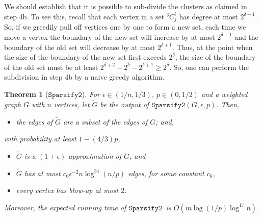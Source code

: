 \documentclass[11pt]{article}
\newtheorem{theorem}{Theorem}[section]
\newcommand{\sparsifytwo}{\ensuremath{\mathtt{Sparsify2}}}
\def\Gtil{\widetilde{G}}
\def\preDelta#1{{}^{\delta}\!{#1}}
\begin{document}
We should establish that it is possible to sub-divide the clusters
  as claimed in step 4b.
To see this, recall that each vertex in a set $\preDelta{C}^{i}_{j}$
  has degree at most $2^{\delta +1}$.
So, if we greedily pull off vertices one by one to form a new set, each time we
  move a vertex the boundary of the new set will increase by at most
  $2^{\delta +1}$ and the boundary of the old set will decrease by at most
  $2^{\delta +1}$.
Thus, at the point when the size of the boundary of the new set
  first exceeds $2^{\delta }$, the size of the boundary of the old set must
  be at least $2^{\delta +2} - 2^{\delta} - 2^{\delta +1} \geq 2^{\delta}$.
So, one can perform the subdivision in step 4b by a naive greedy algorithm.

\begin{theorem}[\sparsifytwo]\label{thm:sparsifytwo}
For $\epsilon \in (1/n, 1/3)$, $p \in (0,1/2)$ and a weighted graph $G$
  with $n$ vertices, let
$\Gtil$ be the output of $\sparsifytwo (G, \epsilon , p)$.
Then,
\begin{itemize}
\item [(Y.1)] the edges of $\Gtil$ are a subset of the edges of $G$; and,
\end{itemize}
with probability at least $1-(4/3) p$,
\begin{itemize}
\item [(Y.2)] $\Gtil$ is a $(1+\epsilon)$-approximation of $G$, and
\item [(Y.3)] $\Gtil$ has at most
  $c_{6} \epsilon^{-2} n \log^{34} (n/p)$
  edges, for some constant $c_{6}$,
\item [(Y.4)] every vertex has blow-up at most $2$.
\end{itemize}
Moreover, the expected running time of \sparsifytwo  \ is 
  $O \left(m  \log (1/p) \log^{17} n \right) $.
\end{theorem}
\end{document}
